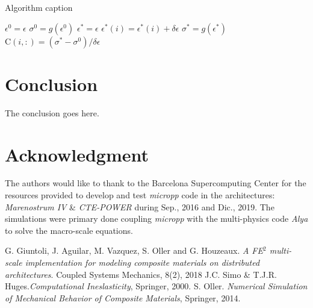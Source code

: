 \documentclass[conference, onecolumn]{IEEEtran}
\begin{document}
\begin{algorithm}
\caption{Algorithm caption}
\label{alg:algorithm-label}
\begin{algorithmic}
 \STATE $ \epsilon^{0} = \epsilon $
 \STATE $ \sigma^{0} = g(\epsilon^{0})$
     \STATE $ \epsilon^{*} = \epsilon $
     \STATE $ \epsilon^{*}(i) = \epsilon^{*}(i) + \delta\epsilon $
     \STATE $ \sigma^{*} = g(\epsilon^{*})$
     \STATE $ \mathrm{C} (i, :) = ( \sigma^* - \sigma^0 ) / \delta\epsilon $
 \ENDFOR
\end{algorithmic}
\end{algorithm}





\section{Conclusion}
The conclusion goes here.

\section*{Acknowledgment}

The authors would like to thank to the Barcelona Supercomputing Center for the resources provided to develop and test \emph{micropp} code in the architectures: \emph{Marenostrum IV} \& \emph{CTE-POWER} during Sep., 2016 and Dic., 2019. The simulations were primary done coupling \emph{micropp} with the multi-physics code \emph{Alya} to solve the macro-scale equations.

\begin{thebibliography}{1}
G. Giuntoli, J. Aguilar, M. Vazquez, S. Oller and G. Houzeaux. \textit{A FE$^2$ multi-scale implementation for modeling composite materials on distributed architectures}. Coupled Systems Mechanics, 8(2), 2018
 J.C. Simo \& T.J.R. Huges.\emph{Computational Ineslasticity}, Springer, 2000. 
 S. Oller. \emph{Numerical Simulation of Mechanical Behavior of Composite Materials}, Springer, 2014. 
\end{thebibliography}
\end{document}
